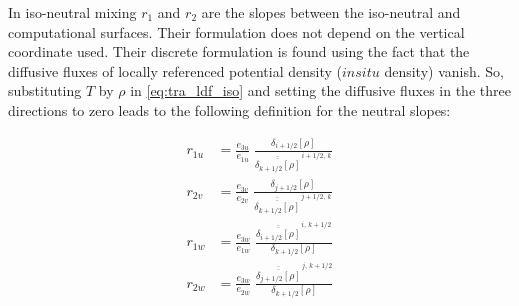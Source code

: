 \documentclass[../main/NEMO_manual]{subfiles}
\begin{document}
In iso-neutral mixing  $r_1$ and $r_2$ are the slopes between the iso-neutral and computational surfaces.
Their formulation does not depend on the vertical coordinate used.
Their discrete formulation is found using the fact that the diffusive fluxes of
locally referenced potential density (\ie $in situ$ density) vanish.
So, substituting $T$ by $\rho$ in \autoref{eq:tra_ldf_iso} and setting the diffusive fluxes in
the three directions to zero leads to the following definition for the neutral slopes:

\begin{equation}
  \label{eq:ldfslp_iso}
  \begin{split}
    r_{1u} &= \frac{e_{3u}}{e_{1u}}\; \frac{\delta_{i+1/2}[\rho]}
    {\overline{\overline{\delta_{k+1/2}[\rho]}}^{\,i+1/2,\,k}} \\
    r_{2v} &= \frac{e_{3v}}{e_{2v}}\; \frac{\delta_{j+1/2}\left[\rho \right]}
    {\overline{\overline{\delta_{k+1/2}[\rho]}}^{\,j+1/2,\,k}} \\
    r_{1w} &= \frac{e_{3w}}{e_{1w}}\;
    \frac{\overline{\overline{\delta_{i+1/2}[\rho]}}^{\,i,\,k+1/2}}
    {\delta_{k+1/2}[\rho]} \\
    r_{2w} &= \frac{e_{3w}}{e_{2w}}\;
    \frac{\overline{\overline{\delta_{j+1/2}[\rho]}}^{\,j,\,k+1/2}}
    {\delta_{k+1/2}[\rho]}
  \end{split}
\end{equation}



\end{document}
